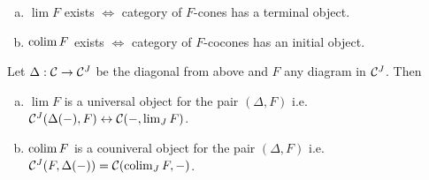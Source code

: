 \documentclass[a4paper]{report}
\begin{document}
\begin{exer}
          \begin{enumerate}[(a)]
\item $\lim F$ exists $\iff$ category of $F$-cones has a terminal object.
\item $\operatorname*{colim} F$ exists $\iff$ category of $F$-cocones has an initial object.
          \end{enumerate}
        \end{exer}
\begin{prop}[Exercise]
  Let $\Delta : \mathcal{C} \to \mathcal{C}^{J}$ be the diagonal from above and $F$ any diagram in $\mathcal{C}^{J}$. Then
  \begin{enumerate}[(a)]
    \item $\lim F$ is a universal object for the pair $(\Delta, F)$ i.e. $\mathcal{C}^{J}(\Delta(-), F) \leftrightarrow \mathcal{C}(-, \lim_{J} F)$.
          \item $\operatorname*{colim} F$ is a couniveral object for the pair $(\Delta, F)$ i.e. $\mathcal{C}^{J}(F, \Delta(-)) = \mathcal{C}(\operatorname*{colim}_{J} F, -)$.
  \end{enumerate}

\end{prop}
\end{document}
